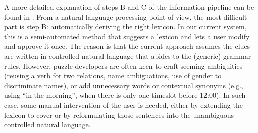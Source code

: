 A more detailed explanation of steps B and C of the information pipeline can be found in \cite{msc/Claes17}. From a natural language processing point of view, the most difficult part is step B: automatically deriving the right lexicon. In our current system, this is a semi-automated method that suggests a lexicon and lets a user modify and approve it once. The reason is 
that the current approach assumes the clues are written in controlled natural language that abides to the (generic) grammar rules. However, puzzle developers are often keen to craft seeming ambiguities (reusing a verb for two relations, name ambiguations, use of gender to discriminate names), or add unnecessary words or contextual synonyms (e.g., using ``in the morning'', when there is only one timeslot before 12:00). In such case,  some manual intervention of the user is needed, either by extending the lexicon to cover or by reformulating those sentences into the unambiguous controlled natural language.
